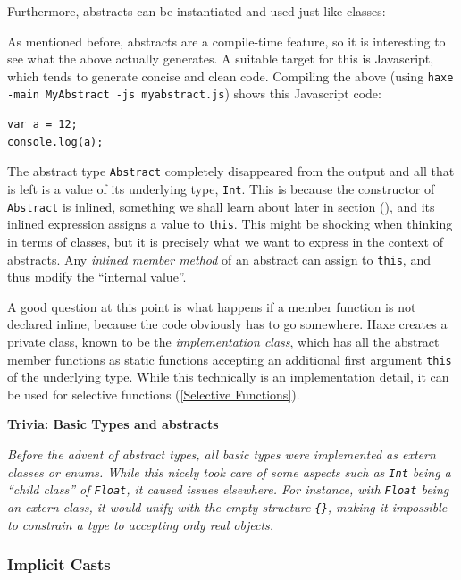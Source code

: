 \documentclass{article}
\newcommand{\target}[1]{#1}
\newcommand{\type}[1]{\texttt{#1}}
\newcommand{\expr}[1]{\texttt{#1}}
\newenvironment{myshaded}
  {\def\FrameCommand{\fboxsep=\topsep\colorbox{bgcolor}}%
  \MakeFramed {\advance\hsize-\width \FrameRestore}}%
 {\endMakeFramed}
\newcommand{\trivia}[2]
	{\begin{myshaded}\noindent\textbf{Trivia: #1}\par\nobreak\noindent\ignorespaces\textit{#2}\end{myshaded}}
\newcommand{\Fullref}[1]{\nameref{#1} (\Cref{#1})}
\newcommand{\tref}[2]{#1 (\ref{#2})}
\newcommand{\haxe}[2][]{%
}
\begin{document}
Furthermore, abstracts can be instantiated and used just like classes:

\haxe[firstline=7,lastline=12]{assets/MyAbstract.hx}
As mentioned before, abstracts are a compile-time feature, so it is interesting to see what the above actually generates. A suitable target for this is \target{Javascript}, which tends to generate concise and clean code. Compiling the above (using \texttt{haxe -main MyAbstract -js myabstract.js}) shows this \target{Javascript} code:

\begin{lstlisting}
var a = 12;
console.log(a);
\end{lstlisting}
The abstract type \type{Abstract} completely disappeared from the output and all that is left is a value of its underlying type, \type{Int}. This is because the constructor of \type{Abstract} is inlined, something we shall learn about later in section \Fullref{Inline}, and its inlined expression assigns a value to \expr{this}. This might be shocking when thinking in terms of classes, but it is precisely what we want to express in the context of abstracts. Any \emph{inlined member method} of an abstract can assign to \expr{this}, and thus modify the ``internal value''.

A good question at this point is what happens if a member function is not declared inline, because the code obviously has to go somewhere. Haxe creates a private class, known to be the \emph{implementation class}, which has all the abstract member functions as static functions accepting an additional first argument \expr{this} of the underlying type. While this technically is an implementation detail, it can be used for \tref{selective functions}{Selective Functions}.



\trivia{Basic Types and abstracts}{Before the advent of abstract types, all basic types were implemented as extern classes or enums. While this nicely took care of some aspects such as \type{Int} being a ``child class'' of \type{Float}, it caused issues elsewhere. For instance, with \type{Float} being an extern class, it would unify with the empty structure \expr{\{\}}, making it impossible to constrain a type to accepting only real objects.}




\subsubsection{Implicit Casts}
\label{Implicit Casts}
\end{document}
